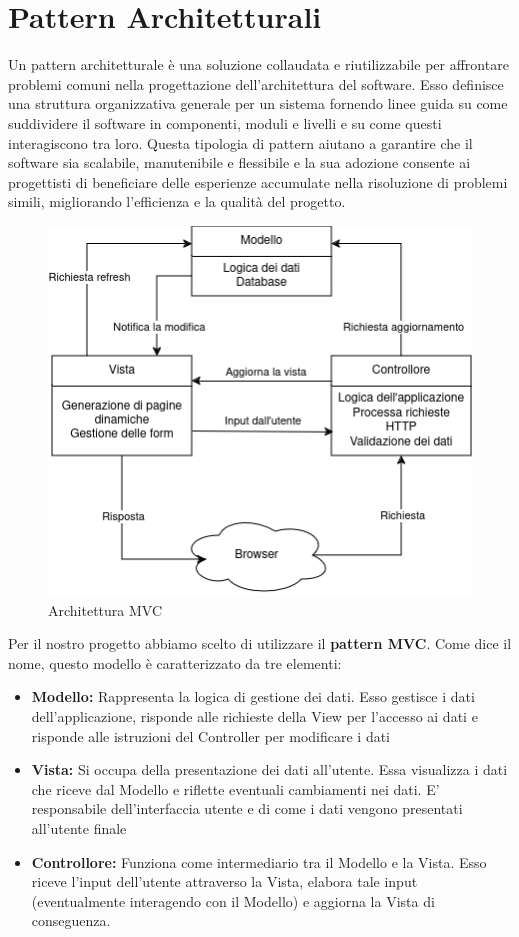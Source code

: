\documentclass[a4paper, 11pt,oneside]{book}
\newcommand{\spacing}{\par\bigskip\noindent}
\begin{document}
\chapter{Pattern Architetturali}
    Un pattern architetturale è una soluzione collaudata e riutilizzabile per affrontare problemi comuni nella progettazione dell'architettura del software. Esso definisce una struttura organizzativa generale per un sistema fornendo linee guida su come suddividere il software in componenti, moduli e livelli e su come questi 
    interagiscono tra loro. Questa tipologia di pattern aiutano a garantire che il software sia scalabile, manutenibile e flessibile e la sua adozione consente ai progettisti di beneficiare delle esperienze accumulate nella risoluzione di problemi simili, migliorando l'efficienza e la qualità del progetto.
    \begin{figure}[H]
        \centering
        \includegraphics[scale=0.75]{Architettura MVC.png}
        \caption{Architettura MVC}
        \label{fig:architettura_mvc}
    \end{figure}
    \spacing
    Per il nostro progetto abbiamo scelto di utilizzare il \textbf{pattern MVC}. Come dice il nome, questo modello è caratterizzato da tre elementi:
    \begin{itemize}
        \item \textbf{Modello:} Rappresenta la logica di gestione dei dati. Esso gestisce i dati dell'applicazione, risponde alle richieste della View per l'accesso ai dati e risponde alle istruzioni del Controller per modificare i dati
        \item \textbf{Vista:} Si occupa della presentazione dei dati all'utente. Essa visualizza i dati che riceve dal Modello e riflette eventuali cambiamenti nei dati. E' responsabile dell'interfaccia utente e di come i dati vengono presentati all'utente finale
        \item \textbf{Controllore:} Funziona come intermediario tra il Modello e la Vista. Esso riceve l'input dell'utente attraverso la Vista, elabora tale input (eventualmente interagendo con il Modello) e aggiorna la Vista di conseguenza.
    \end{itemize}
\end{document}
